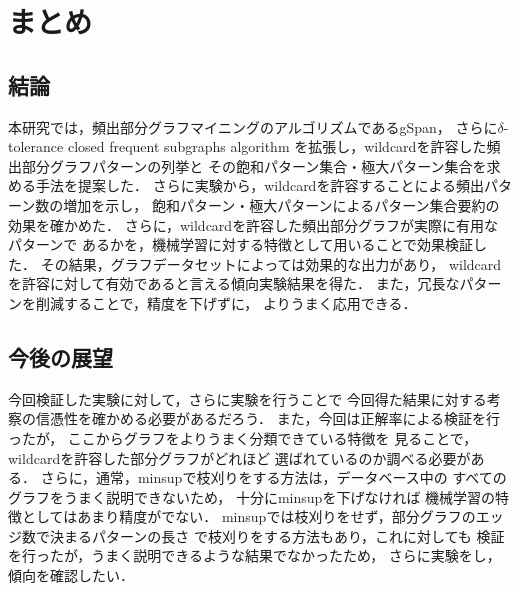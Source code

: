 
\chapter{まとめ}
\section{結論}
本研究では，頻出部分グラフマイニングのアルゴリズムであるgSpan，
さらに$\delta$-tolerance closed frequent subgraphs algorithm
を拡張し，wildcardを許容した頻出部分グラフパターンの列挙と
その飽和パターン集合・極大パターン集合を求める手法を提案した．
さらに実験から，wildcardを許容することによる頻出パターン数の増加を示し，
飽和パターン・極大パターンによるパターン集合要約の効果を確かめた．
さらに，wildcardを許容した頻出部分グラフが実際に有用なパターンで
あるかを，機械学習に対する特徴として用いることで効果検証した．
その結果，グラフデータセットによっては効果的な出力があり，
wildcardを許容に対して有効であると言える傾向実験結果を得た．
また，冗長なパターンを削減することで，精度を下げずに，
よりうまく応用できる．

\section{今後の展望}
今回検証した実験に対して，さらに実験を行うことで
今回得た結果に対する考察の信憑性を確かめる必要があるだろう．
また，今回は正解率による検証を行ったが，
ここからグラフをよりうまく分類できている特徴を
見ることで，wildcardを許容した部分グラフがどれほど
選ばれているのか調べる必要がある．
さらに，通常，minsupで枝刈りをする方法は，データベース中の
すべてのグラフをうまく説明できないため，
十分にminsupを下げなければ
機械学習の特徴としてはあまり精度がでない．
minsupでは枝刈りをせず，部分グラフのエッジ数で決まるパターンの長さ
で枝刈りをする方法もあり，これに対しても
検証を行ったが，うまく説明できるような結果でなかったため，
さらに実験をし，傾向を確認したい．
